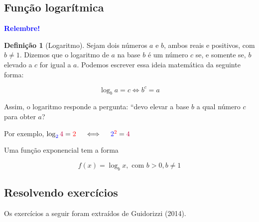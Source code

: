 \documentclass[12pt,openright,twoside,a4paper]{article}
\theoremstyle{definition}
\newtheorem{definition}{Definição}[section]
\begin{document}
	\subsection{Função logarítmica}
	
	\begin{snugshade}
		\textbf{\textcolor{blue}{Relembre!}}
		
		\begin{definition}[Logaritmo]
			Sejam dois números $a$ e $b$, ambos reais e positivos, com $b \neq 1$. Dizemos que o logaritmo de $a$ na base $b$ é um número $c$ se, e somente se, $b$ elevado a $c$ for igual a $a$.
			Podemos escrever essa ideia matemática da seguinte forma:
			
			\begin{equation*}
				\log_ba = c \iff b^c = a
			\end{equation*}        
		\end{definition}
		
		Assim, o logaritmo responde a pergunta: ``devo elevar a base $b$ a qual número $c$ para obter $a$?
		
		Por exemplo, $\log_{\textcolor{blue}{2}}\textcolor{purple}{4} = \textcolor{red}{2}
		\quad \iff \quad
		\textcolor{blue}{2}^{\textcolor{red}{2}} = \textcolor{purple}{4}$
	\end{snugshade}
	
	
	Uma função exponencial tem a forma
	
	\begin{equation}
		f(x) = \log_bx, \text{ com } b > 0, b \neq 1
	\end{equation}
	
	\subsection{Resolvendo exercícios}
	Os exercícios a seguir foram extraídos de Guidorizzi (2014).
	
\end{document}
